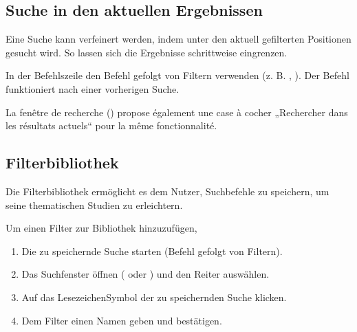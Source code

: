 \documentclass[letterpaper,10pt,german]{sphinxmanual}
\begin{document}
\subsection{Suche in den aktuellen Ergebnissen}
\label{\detokenize{annexe_filtres:recherche-dans-les-resultats-courants}}
\sphinxAtStartPar
Eine Suche kann verfeinert werden, indem unter den aktuell gefilterten Positionen gesucht wird. So lassen sich die Ergebnisse schrittweise eingrenzen.

\sphinxAtStartPar
In der Befehlszeile den Befehl  gefolgt von Filtern verwenden (z. B. , ). Der Befehl  funktioniert nach einer vorherigen Suche.

\sphinxAtStartPar
La fenêtre de recherche () propose également une case à cocher
„Rechercher dans les résultats actuels“ pour la même fonctionnalité.


\subsection{Filterbibliothek}
\label{\detokenize{annexe_filtres:bibliotheque-de-filtres}}
\sphinxAtStartPar
Die Filterbibliothek ermöglicht es dem Nutzer, Suchbefehle zu speichern, um seine thematischen Studien zu erleichtern.

\sphinxAtStartPar
Um einen Filter zur Bibliothek hinzuzufügen,
\begin{enumerate}
%
\item {} 
\sphinxAtStartPar
Die zu speichernde Suche starten (Befehl  gefolgt von Filtern).

\item {} 
\sphinxAtStartPar
Das Suchfenster öffnen ( oder ) und den Reiter  auswählen.

\item {} 
\sphinxAtStartPar
Auf das Lesezeichen\sphinxhyphen{}Symbol der zu speichernden Suche klicken.

\item {} 
\sphinxAtStartPar
Dem Filter einen Namen geben und bestätigen.

\end{enumerate}
\end{document}
